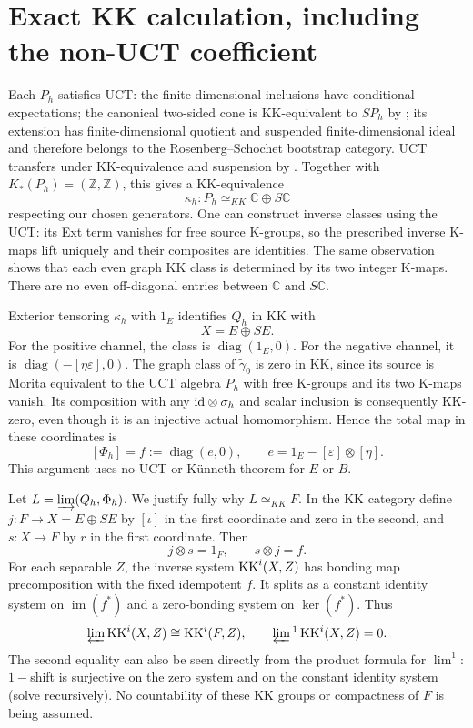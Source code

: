 \documentclass[11pt,letterpaper]{amsart}
\theoremstyle{remark}\newtheorem{remark}[theorem]{Remark}
\newcommand{\Z}{\mathbb Z}\newcommand{\C}{\mathbb C}
\begin{document}
\section{Exact KK calculation, including the non-UCT coefficient}
Each $P_h$ satisfies UCT: the finite-dimensional inclusions have
conditional expectations; the canonical two-sided cone is KK-equivalent
to $SP_h$ by \cite[Theorem 4.1]{FG}; its extension has finite-dimensional
quotient and suspended finite-dimensional ideal and therefore belongs
to the Rosenberg--Schochet bootstrap category. UCT transfers under
KK-equivalence and suspension by \cite[Theorem 1.17, Proposition 7.1]{RS}.
Together with $K_*(P_h)=(\Z,\Z)$, this gives a KK-equivalence
\[
                 \kappa_h:P_h\simeq_{KK}\C\oplus S\C
\]
respecting our chosen generators. One can construct inverse classes
using the UCT: its Ext term vanishes for free source K-groups, so the
prescribed inverse K-maps lift uniquely and their composites are identities.
The same observation shows that each even graph KK class is determined
by its two integer K-maps. There are no even off-diagonal entries between
$\C$ and $S\C$.

Exterior tensoring $\kappa_h$ with $1_E$ identifies $Q_h$ in KK with
\[
                            X=E\oplus SE.
\]
For the positive channel, the class is $\operatorname{diag}(1_E,0)$.
For the negative channel, it is
$\operatorname{diag}(-[\eta\varepsilon],0)$.
The graph class of $\widetilde\gamma_0$ is zero in KK, since its source
is Morita equivalent to the UCT algebra $P_h$ with free K-groups and
its two K-maps vanish. Its composition with any $\mathrm{id}\otimes\sigma_h$
and scalar inclusion is consequently KK-zero, even though it is an
injective actual homomorphism. Hence the total map in these coordinates is
\begin{equation}\label{eq:idempotent}
                   [\Phi_h]=f:=\operatorname{diag}(e,0),
                   \qquad e=1_E-[\varepsilon]\otimes[\eta].
\end{equation}
This argument uses no UCT or K\"unneth theorem for $E$ or $B$.

Let $L=\varinjlim(Q_h,\Phi_h)$. We justify fully why $L\simeq_{KK}F$.
In the KK category define $j:F\to X=E\oplus SE$ by $[\iota]$ in the
first coordinate and zero in the second, and $s:X\to F$ by $r$ in the
first coordinate. Then
\[
                  j\otimes s=1_F,\qquad s\otimes j=f.
\]
For each separable $Z$, the inverse system $\operatorname{KK}^i(X,Z)$ has bonding map
precomposition with the fixed idempotent $f$. It splits as a constant
identity system on $\operatorname{im}(f^*)$ and a zero-bonding system on
$\ker(f^*)$. Thus
\[
 \varprojlim\operatorname{KK}^i(X,Z)\cong\operatorname{KK}^i(F,Z),\qquad
 \varprojlim{}^1\operatorname{KK}^i(X,Z)=0.
\]
The second equality can also be seen directly from the product formula
for $\lim^1$: $1-$shift is surjective on the zero system and on the
constant identity system (solve recursively). No countability of these
KK groups or compactness of $F$ is being assumed.
\end{document}
